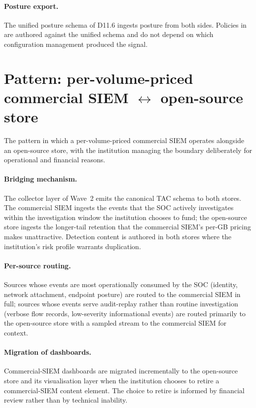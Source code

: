 \paragraph{Posture export.} The unified posture schema of D11.6
ingests posture from both sides. Policies in
 are authored against the unified schema and
do not depend on which configuration management produced the
signal.

\section{Pattern: per-volume-priced commercial SIEM \texorpdfstring{$\leftrightarrow$}{<->} open-source store}
\label{sec:cp-splunk-opensearch}

The pattern in which a per-volume-priced commercial SIEM operates
alongside an open-source store, with the institution managing the
boundary deliberately for operational and financial reasons.

\paragraph{Bridging mechanism.} The collector layer of Wave~2
emits the canonical TAC schema to both stores. The commercial SIEM
ingests the events that the SOC actively investigates within the
investigation window the institution chooses to fund; the
open-source store ingests the longer-tail retention that the
commercial SIEM's per-GB pricing makes unattractive. Detection
content is authored in both stores where the institution's risk
profile warrants duplication.

\paragraph{Per-source routing.} Sources whose events are most
operationally consumed by the SOC (identity, network attachment,
endpoint posture) are routed to the commercial SIEM in full;
sources whose events serve audit-replay rather than routine
investigation (verbose flow records, low-severity informational
events) are routed primarily to the open-source store with a
sampled stream to the commercial SIEM for context.

\paragraph{Migration of dashboards.} Commercial-SIEM dashboards are
migrated incrementally to the open-source store and its
visualisation layer when the institution chooses to retire a
commercial-SIEM content element. The choice to retire is informed
by financial review rather than by technical inability.


